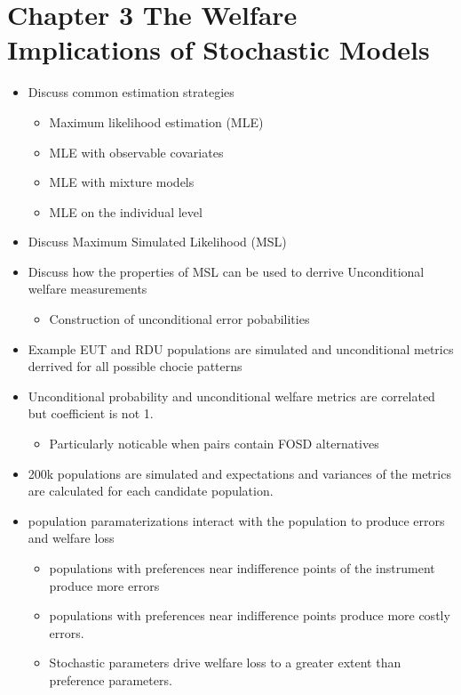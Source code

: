 \documentclass[12pt,a4paper]{article}\usepackage[]{graphicx}\usepackage[]{color}
\begin{document}
\section{Chapter 3 The Welfare Implications of Stochastic Models}

\begin{itemize}
	\item Discuss common estimation strategies
		\begin{itemize}
			\item Maximum likelihood estimation (MLE)
			\item MLE with observable covariates
			\item MLE with mixture models
			\item MLE on the individual level
		\end{itemize}
	\item Discuss Maximum Simulated Likelihood (MSL)
	\item Discuss how the properties of MSL can be used to derrive Unconditional welfare measurements
		\begin{itemize}
			\item Construction of unconditional error pobabilities
		\end{itemize}
	\item Example EUT and RDU populations are simulated and unconditional metrics derrived for all possible chocie patterns
	\item Unconditional probability and unconditional welfare metrics are correlated but coefficient is not 1.
		\begin{itemize}
			\item Particularly noticable when pairs contain FOSD alternatives
		\end{itemize}
	\item 200k populations are simulated and expectations and variances of the metrics are calculated for each candidate population.
	\item population paramaterizations interact with the population to produce errors and welfare loss
		\begin{itemize}
			\item populations with preferences near indifference points of the instrument produce more errors
			\item populations with preferences near indifference points produce more costly errors.
			\item Stochastic parameters drive welfare loss to a greater extent than preference parameters.
		\end{itemize}
	
\end{itemize}
\end{document}
